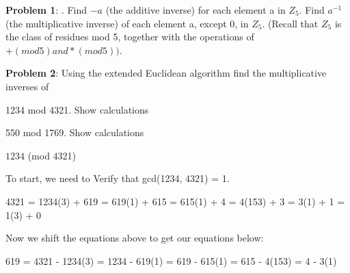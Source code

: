 \documentclass[12pt,letterpaper,final]{report}
\begin{document}

\vline


\noindent\textbf{Problem 1}: . Find $-a$ (the additive inverse) for each element a in $Z_{5}$.  Find $a^{-1}$   (the multiplicative inverse) of each element a, except 0, in $Z_{5}$. 
(Recall that $Z_{5}$   is the class of residues mod 5, together with the operations of $+ (mod 5) and * (mod 5))$.
 

\bigskip
\noindent\textbf{Problem 2}: Using the extended Euclidean algorithm find the multiplicative inverses of

\begin{alphalist}
	\item 1234 mod 4321. Show calculations
	\item 550 mod 1769. Show calculations
	
\end{alphalist}

\bigskip
$1234$ (mod 4321)  \newline

To start, we need to Verify that gcd(1234, 4321) = 1.\newline

4321 = 1234(3) + 619 = 619(1) + 615 = 615(1) + 4 = 4(153) + 3 = 3(1) + 1	 = 1(3) + 0  \newline

Now we shift the equations above to get our equations below: \newline

619 = 4321 - 1234(3)  = 1234 - 619(1)  = 619 - 615(1)  = 615 - 4(153)	  = 4 - 3(1) \newline
\end{document}
